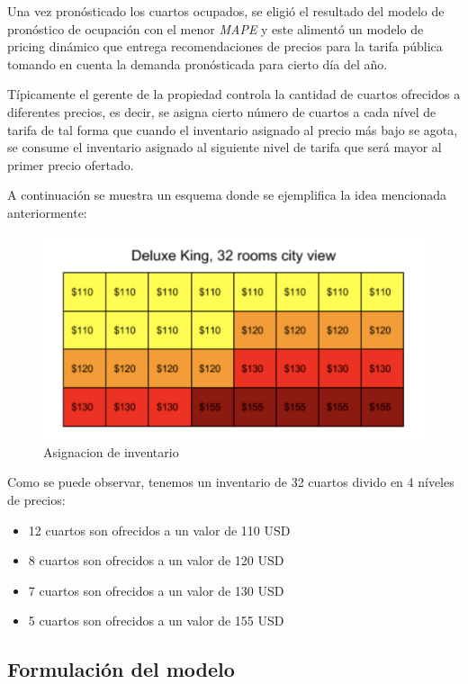 Una vez pronósticado los cuartos ocupados, se eligió el resultado del modelo de pronóstico de ocupación con el menor \emph{MAPE} y este alimentó un modelo de pricing dinámico que entrega recomendaciones de precios para la tarifa pública tomando en cuenta la demanda pronósticada para cierto día del año.

Típicamente el gerente de la propiedad controla la cantidad de cuartos ofrecidos a diferentes precios, es decir, se asigna cierto número de cuartos a cada nível de tarifa de tal forma que cuando el inventario asignado al precio más bajo se agota, se consume el inventario asignado al siguiente nivel de tarifa que será mayor al primer precio ofertado.

A continuación se muestra un esquema donde se ejemplifica la idea mencionada anteriormente:

\begin{figure}[H]
  \includegraphics[width=\linewidth]{Figures/buckets.png}
  \caption{Asignacion de inventario}
  \label{fig:Asignacion de Inventario}
\end{figure}

Como se puede observar, tenemos un inventario de 32 cuartos divido en 4 níveles de precios:
\begin{itemize}[noitemsep]
\item 12 cuartos son ofrecidos a un valor de 110 USD
\item 8 cuartos son ofrecidos a un valor de 120 USD
\item 7 cuartos son ofrecidos a un valor de 130 USD
\item 5 cuartos son ofrecidos a un valor de 155 USD
\end{itemize}

\subsection*{Formulación del modelo}

